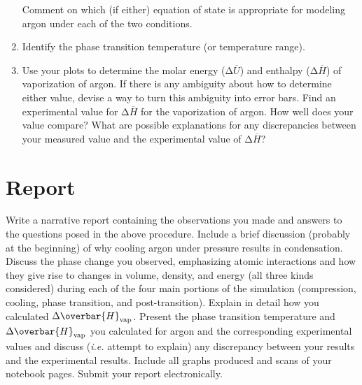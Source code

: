 \documentclass{article}
\begin{document}
\begin{enumerate}
    Comment on which (if either) equation of state is appropriate for modeling argon under each of the two conditions.
  \item Identify the phase transition temperature (or temperature range).
  \item Use your plots to determine the molar energy ($\increment \overbar{U}$) and enthalpy ($\increment \overbar{H}$) of vaporization of argon.
    If there is any ambiguity about how to determine either value, devise a way to turn this ambiguity into error bars. 
    Find an experimental value for $\increment \overbar{H}$ for the vaporization of argon.
    How well does your value compare?
    What are possible explanations for any discrepancies between your measured value and the experimental value of $\increment \overbar{H}$?
\end{enumerate}

\section{Report}
Write a narrative report containing the observations you made and answers to the questions posed in the above procedure.
Include a brief discussion (probably at the beginning) of why cooling argon under pressure results in condensation.
Discuss the phase change you observed, emphasizing atomic interactions and how they give rise to changes in volume, density, and energy (all three kinds considered) during each of the four main portions of the simulation (compression, cooling, phase transition, and post-transition).
Explain in detail how you calculated $\increment \overbar{H}\subword{vap}$.
Present the phase transition temperature and $\increment \overbar{H}\subword{vap}$ you calculated for argon and the corresponding experimental values and discuss (\emph{i.e.} attempt to explain) any discrepancy between your results and the experimental results.
Include all graphs produced and scans of your notebook pages.
Submit your report electronically.
\end{document}
